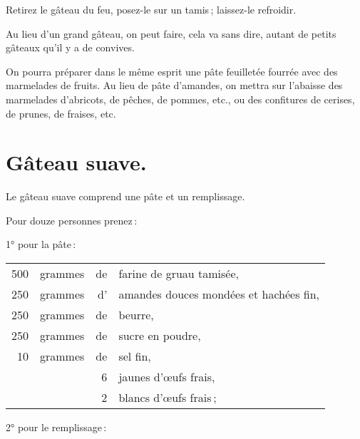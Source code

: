 Retirez le gâteau du feu, posez-le sur un tamis ; laissez-le refroidir.

\sk

Au lieu d'un grand gâteau, on peut faire, cela va sans dire, autant de petits
gâteaux qu'il y a de convives.

\sk

On pourra préparer dans le même esprit une pâte feuilletée fourrée avec des
marmelades de fruits. Au lieu de pâte d'amandes, on mettra sur l’abaisse des
marmelades d'abricots, de pêches, de pommes, etc., ou des confitures de
cerises, de prunes, de fraises, etc.

\section*{\centering Gâteau suave.}
{}

Le gâteau suave comprend une pâte et un remplissage.

\medskip

Pour douze personnes prenez :

\medskip

1° pour la pâte :

\footnotesize
\begin{longtable}{rrrp{16em}}
    500 & grammes & de & farine de gruau tamisée,                                                         \\
    250 & grammes & d' & amandes douces mondées et hachées fin,                                           \\
    250 & grammes & de & beurre,                                                                          \\
    250 & grammes & de & sucre en poudre,                                                                 \\
     10 & grammes & de & sel fin,                                                                         \\
        &         &  6 & jaunes d'œufs frais,                                                             \\
        &         &  2 & blancs d'œufs frais ;                                                            \\
\end{longtable}
\normalsize

2° pour le remplissage :

